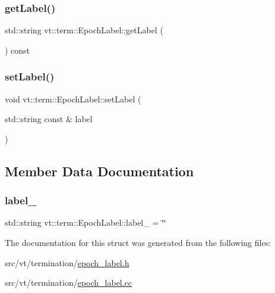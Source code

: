 \subsubsection{\texorpdfstring{get\+Label()}{getLabel()}}
{\footnotesize\ttfamily std\+::string vt\+::term\+::\+Epoch\+Label\+::get\+Label (\begin{DoxyParamCaption}{ }\end{DoxyParamCaption}) const}

\mbox{\label{structvt_1_1term_1_1_epoch_label_ac140591669a7a6773626612feefe6009}} 
\subsubsection{\texorpdfstring{set\+Label()}{setLabel()}}
{\footnotesize\ttfamily void vt\+::term\+::\+Epoch\+Label\+::set\+Label (\begin{DoxyParamCaption}\item[{std\+::string const \&}]{label }\end{DoxyParamCaption})}



\subsection{Member Data Documentation}
\mbox{\label{structvt_1_1term_1_1_epoch_label_a382a1d7b4748e26ba2bc0200636379e6}} 
\subsubsection{\texorpdfstring{label\+\_\+}{label\_}}
{\footnotesize\ttfamily std\+::string vt\+::term\+::\+Epoch\+Label\+::label\+\_\+ = \char`\"{}\char`\"{}\hspace{0.3cm}{\ttfamily [private]}}



The documentation for this struct was generated from the following files\+:\begin{DoxyCompactItemize}
\item 
src/vt/termination/\hyperlink{epoch__label_8h}{epoch\+\_\+label.\+h}\item 
src/vt/termination/\hyperlink{epoch__label_8cc}{epoch\+\_\+label.\+cc}\end{DoxyCompactItemize}
